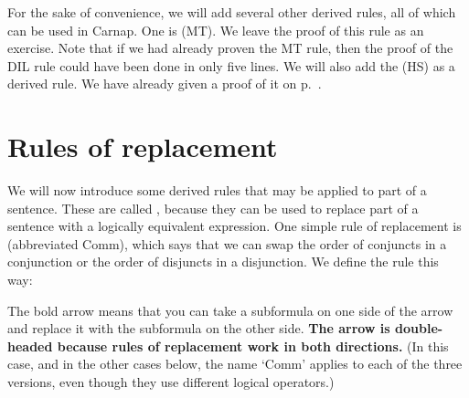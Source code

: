 For the sake of convenience, we will add several other derived rules, all of which can be used in Carnap. One is  (MT).
\noindent We leave the proof of this rule as an exercise. Note that if we had already proven the MT rule, then the proof of the DIL rule could have been done in only five lines.
We will also add the  (HS) as a derived rule. We have already given a proof of it on p.~\pageref{HSproof}.


\section{Rules of replacement}

We will now introduce some derived rules that may be applied to part of a sentence. These are called , because they can be used to replace part of a sentence with a logically equivalent expression. One simple rule of replacement is  (abbreviated Comm), which says that we can swap the order of conjuncts in a conjunction or the order of disjuncts in a disjunction. We define the rule this way:

The bold arrow means that you can take a subformula on one side of the arrow and replace it with the subformula on the other side. \textbf{The arrow is double-headed because rules of replacement work in both directions.} (In this case, and in the other cases below, the name `Comm' applies to each of the three versions, even though they use different logical operators.)


